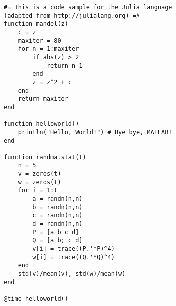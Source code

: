 \documentclass{article}
\begin{document}
\begin{lstlisting}
#= This is a code sample for the Julia language
(adapted from http://julialang.org) =#
function mandel(z)
    c = z
    maxiter = 80
    for n = 1:maxiter
        if abs(z) > 2
            return n-1
        end
        z = z^2 + c
    end
    return maxiter
end

function helloworld()
    println("Hello, World!") # Bye bye, MATLAB!
end

function randmatstat(t)
    n = 5
    v = zeros(t)
    w = zeros(t)
    for i = 1:t
        a = randn(n,n)
        b = randn(n,n)
        c = randn(n,n)
        d = randn(n,n)
        P = [a b c d]
        Q = [a b; c d]
        v[i] = trace((P.'*P)^4)
        w[i] = trace((Q.'*Q)^4)
    end
    std(v)/mean(v), std(w)/mean(w)
end

@time helloworld()

\end{lstlisting}
\end{document}
